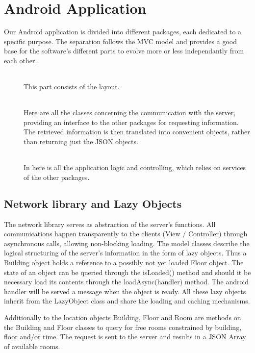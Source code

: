 \section{Android Application}
Our Android application is divided into different packages, each dedicated to a specific purpose. The separation follows the MVC model and provides a good base for the software's different parts to evolve more or less independantly from each other.

\begin{description}
	\item[]\hfill\\This part consists of the layout.
	\item[]\hfill\\Here are all the classes concerning the communication with the server, providing an interface to the other packages for requesting information. The retrieved information is then translated into convenient objects, rather than returning just the JSON objects.
	\item[]\hfill\\In here is all the application logic and controlling, which relies on services of the other packages.
\end{description}

\subsection{Network library and Lazy Objects}
The network library serves as abstraction of the server's functions. All communications happen transparently to the clients (View / Controller) through asynchronous calls, allowing non-blocking loading. The model classes describe the logical structuring of the server's information in the form of lazy objects. Thus a Building object holds a reference to a possibly not yet loaded Floor object. The state of an object can be queried through the isLoaded() method and should it be necessary load its contents through the loadAsync(handler) method. The android handler will be served a message when the object is ready. All these lazy objects inherit from the LazyObject class and share the loading and caching mechanisms.

Additionally to the location objects Building, Floor and Room are methods on the Building and Floor classes to query for free rooms constrained by building, floor and/or time. The request is sent to the server and results in a JSON Array of available rooms.

